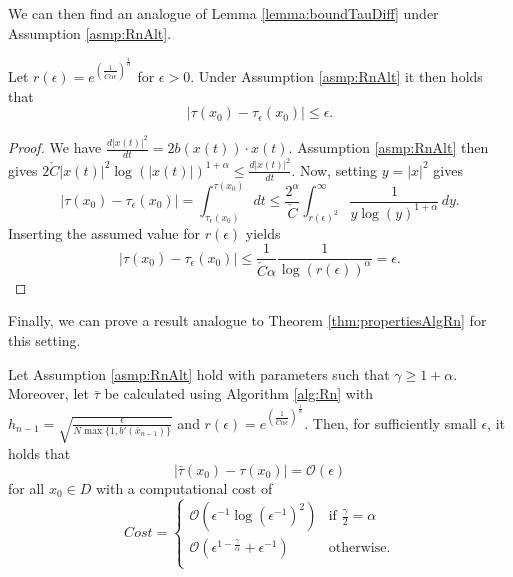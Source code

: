 \documentclass[a4paper, oneside, reqno]{amsart}
\newcommand{\abs}[1]{\left\lvert#1\right\rvert}
\theoremstyle{remark}
\begin{document}
We can then find an analogue of Lemma \ref{lemma:boundTauDiff} under Assumption \ref{asmp:RnAlt}.
\begin{corr}
    \label{corr:boundTauDiffAlt}
    Let \(r(\epsilon) = e^{\left(\frac{1}{\check{C}\alpha\epsilon}\right)^{\frac{1}{\alpha}}}\) for \(\epsilon > 0\).
    Under Assumption \ref{asmp:RnAlt} it then holds that
    \[\abs{\tau(x_0)-\tau_\epsilon(x_0)} \leq \epsilon.\]
\end{corr}
\begin{proof}
    We have \(\frac{d\abs{x(t)}^2}{dt} = 2b(x(t))\cdot x(t)\). Assumption \ref{asmp:RnAlt} then gives \(2\check{C}\abs{x(t)}^2\log(\abs{x(t)})^{1+\alpha} \leq \frac{d\abs{x(t)}^2}{dt}\). Now, setting \(y = \abs{x}^2\) gives
    \[\abs{\tau(x_0)-\tau_\epsilon(x_0)} = \int^{\tau(x_0)}_{\tau_\epsilon(x_0)}\,dt \leq \frac{2^{\alpha}}{\check{C}}\int^\infty_{r(\epsilon)^2}\frac{1}{y\log(y)^{1+\alpha}}\,dy.\]
    Inserting the assumed value for \(r(\epsilon)\) yields
    \[\abs{\tau(x_0)-\tau_\epsilon(x_0)} \leq \frac{1}{\check{C}\alpha}\frac{1}{\log(r(\epsilon))^\alpha} = \epsilon.\]
\end{proof}
Finally, we can prove a result analogue to Theorem \ref{thm:propertiesAlgRn} for this setting. 
\begin{corr}
    \label{corr:propertiesAlgRnLog}
    Let Assumption \ref{asmp:RnAlt} hold with parameters such that \(\gamma \geq 1 + \alpha\). Moreover, let \(\bar\tau\) be calculated using Algorithm \ref{alg:Rn} with \(h_{n-1} = \sqrt{\frac{\epsilon }{N\max\{1, b'(\bar x_{n-1})\}}}\) and \(r(\epsilon)=e^{\left(\frac{1}{\check{C}\alpha\epsilon}\right)^{\frac{1}{\alpha}}}\). Then, for sufficiently small \(\epsilon\), it holds that
    \[\abs{\bar\tau(x_0) - \tau(x_0)} = \mathcal{O}(\epsilon)\]
    for all \(x_0 \in D\) with a computational cost of 
    \[Cost =  
    \begin{cases}
        \mathcal{O}(\epsilon^{-1}\log(\epsilon^{-1})^2) & \text{if } \frac{\gamma}{2} = \alpha \\
        \mathcal{O}(\epsilon^{1-\frac{\gamma}{\alpha}} + \epsilon^{-1}) & \text{otherwise}. \\
    \end{cases}\]
\end{corr}
\end{document}
